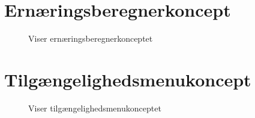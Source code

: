 \documentclass[12pt, a4paper]{article}
\begin{document}
\section{Ernæringsberegnerkoncept}
\begin{figure}[H]
    \centering
    \caption{Viser ernæringsberegnerkonceptet}
\end{figure}

\section{Tilgængelighedsmenukoncept}
\begin{figure}[H]
    \centering
    \caption{Viser tilgængelighedsmenukonceptet}
\end{figure}
\end{document}
